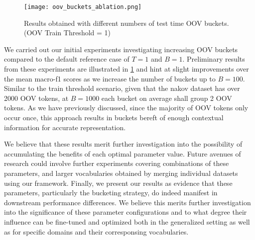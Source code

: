 \documentclass[../../fyp.tex]{subfiles}
\begin{document}
\begin{figure}[!ht]
	\centering
	\texttt{[image: oov\_buckets\_ablation.png]}
	\caption{Results obtained with different numbers of test time OOV buckets. (OOV Train Threshold = 1)}
	\label{fig:oov_threshold_ablation}
\end{figure}

We carried out our initial experiments investigating increasing OOV buckets compared to the default reference case of $T=1$ and $B=1$. Preliminary results from these experiments are illustrated in \ref{fig:oov_threshold_ablation} and hint at slight improvements over the mean macro-f1 scores as we increase the number of buckets up to $B=100$. Similar to the train threshold scenario, given that the nakov dataset has over 2000 OOV tokens, at $B=1000$ each bucket on average shall group 2 OOV tokens. As we have previously discussed, since the majority of OOV tokens only occur once, this approach results in buckets bereft of enough contextual information for accurate representation. 

We believe that these results merit further investigation into the possibility of accumulating the benefits of each optimal parameter value. Future avenues of research could involve further experiments covering combinations of these parameters, and larger vocabularies obtained by merging individual datasets using our framework. Finally, we present our results as evidence that these parameters, particularly the bucketing strategy, do indeed manifest in downstream performance differences. We believe this merits further investigation into the significance of these parameter configurations and to what degree their influence can be fine-tuned and optimized both in the generalized setting as well as for specific domains and their corresponsing vocabularies.
\end{document}
